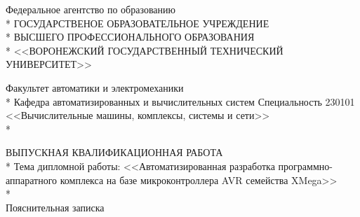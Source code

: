 \begin{center}
Федеральное агентство по образованию \\*
\MakeUppercase{Государственое образовательное учреждение} \\*
\MakeUppercase{Высшего профессионального образования} \\*
<<\MakeUppercase{Воронежский государственный технический университет}>> \\
\end{center}

\begin{center}
Факультет  автоматики и электромеханики \\*
Кафедра автоматизированных и вычислительных систем
Специальность 230101 <<Вычислительные машины, комплексы, системы и сети>> \\*
\end{center}

\begin{center}
\MakeUppercase{Выпускная квалификационная работа} \\*
Тема дипломной работы: <<Автоматизированная разработка программно-аппаратного комплекса
на базе микроконтроллера AVR семейства XMega>> \\*
~ \\
Пояснительная записка
\end{center}

\begin{par}~\end{par}

